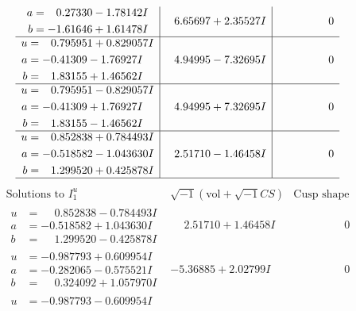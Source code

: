 \documentclass[1p]{elsarticle_modified}
\theoremstyle{definition}
\newcommand{\I}{\sqrt{-1}}
\begin{document}
$$\begin{array}{c|c|c}
\begin{aligned}
a &= \phantom{-}0.27330 - 1.78142 I \\
b &= -1.61646 + 1.61478 I\end{aligned}
 & \phantom{-}6.65697 + 2.35527 I & \phantom{-0.000000 } 0 \\ \hline\begin{aligned}
u &= \phantom{-}0.795951 + 0.829057 I \\
a &= -0.41309 - 1.76927 I \\
b &= \phantom{-}1.83155 + 1.46562 I\end{aligned}
 & \phantom{-}4.94995 - 7.32695 I & \phantom{-0.000000 } 0 \\ \hline\begin{aligned}
u &= \phantom{-}0.795951 - 0.829057 I \\
a &= -0.41309 + 1.76927 I \\
b &= \phantom{-}1.83155 - 1.46562 I\end{aligned}
 & \phantom{-}4.94995 + 7.32695 I & \phantom{-0.000000 } 0 \\ \hline\begin{aligned}
u &= \phantom{-}0.852838 + 0.784493 I \\
a &= -0.518582 - 1.043630 I \\
b &= \phantom{-}1.299520 + 0.425878 I\end{aligned}
 & \phantom{-}2.51710 - 1.46458 I & \phantom{-0.000000 } 0\\
 \hline 
 \end{array}$$\newpage$$\begin{array}{c|c|c}  
\text{Solutions to }I^u_{1}& \I (\text{vol} + \sqrt{-1}CS) & \text{Cusp shape}\\
 \hline 
\begin{aligned}
u &= \phantom{-}0.852838 - 0.784493 I \\
a &= -0.518582 + 1.043630 I \\
b &= \phantom{-}1.299520 - 0.425878 I\end{aligned}
 & \phantom{-}2.51710 + 1.46458 I & \phantom{-0.000000 } 0 \\ \hline\begin{aligned}
u &= -0.987793 + 0.609954 I \\
a &= -0.282065 - 0.575521 I \\
b &= \phantom{-}0.324092 + 1.057970 I\end{aligned}
 & -5.36885 + 2.02799 I & \phantom{-0.000000 } 0 \\ \hline\begin{aligned}
u &= -0.987793 - 0.609954 I \\

\end{aligned}
\end{array}$$
\end{document}
